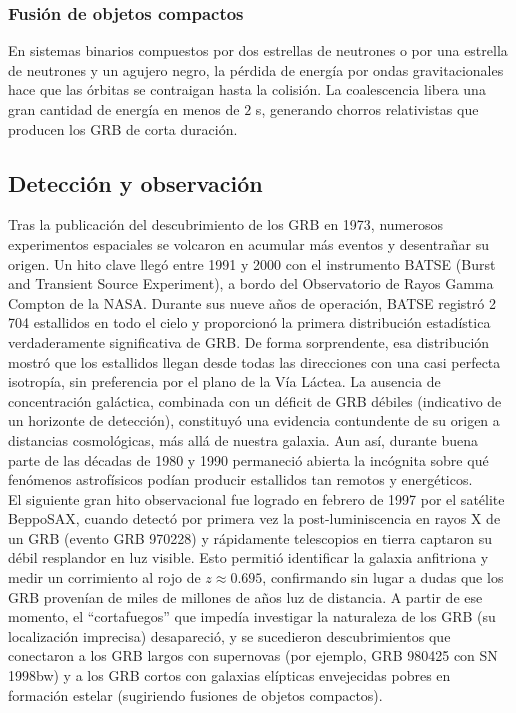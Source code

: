 \documentclass[final,5p,times,twocolumn,authoryear]{elsarticle}
\begin{document}
\subsubsection{Fusión de objetos compactos}
En sistemas binarios compuestos por dos estrellas de neutrones o por una
estrella de neutrones y un agujero negro, la pérdida de energía por ondas
gravitacionales hace que las órbitas se contraigan hasta la colisión.
La coalescencia libera una gran cantidad de energía en menos de $2$ s,
generando chorros relativistas que producen los GRB de corta duración.

\subsection{Detección y observación}

Tras la publicación del descubrimiento de los GRB en 1973, numerosos experimentos espaciales se volcaron en acumular más eventos y desentrañar su origen. Un hito clave llegó entre 1991 y 2000 con el instrumento BATSE (Burst and Transient Source Experiment), a bordo del Observatorio de Rayos Gamma Compton de la NASA. Durante sus nueve años de operación, BATSE registró 2 704 estallidos en todo el cielo y proporcionó la primera distribución estadística verdaderamente significativa de GRB. De forma sorprendente, esa distribución mostró que los estallidos llegan desde todas las direcciones con una casi perfecta isotropía, sin preferencia por el plano de la Vía Láctea. La ausencia de concentración galáctica, combinada con un déficit de GRB débiles (indicativo de un horizonte de detección), constituyó una evidencia contundente de su origen a distancias cosmológicas, más allá de nuestra galaxia. Aun así, durante buena parte de las décadas de 1980 y 1990 permaneció abierta la incógnita sobre qué fenómenos astrofísicos podían producir estallidos tan remotos y energéticos.\\

El siguiente gran hito observacional fue logrado en febrero de 1997 por el satélite BeppoSAX, cuando detectó por primera vez la post-luminiscencia en rayos X de un GRB (evento GRB 970228) y rápidamente telescopios en tierra captaron su débil resplandor en luz visible. Esto permitió identificar la galaxia anfitriona y medir un corrimiento al rojo de \(z \approx 0.695\), confirmando sin lugar a dudas que los GRB provenían de miles de millones de años luz de distancia. A partir de ese momento, el ``cortafuegos'' que impedía investigar la naturaleza de los GRB (su localización imprecisa) desapareció, y se sucedieron descubrimientos que conectaron a los GRB largos con supernovas (por ejemplo, GRB 980425 con SN 1998bw) y a los GRB cortos con galaxias elípticas envejecidas pobres en formación estelar (sugiriendo fusiones de objetos compactos).
\end{document}
